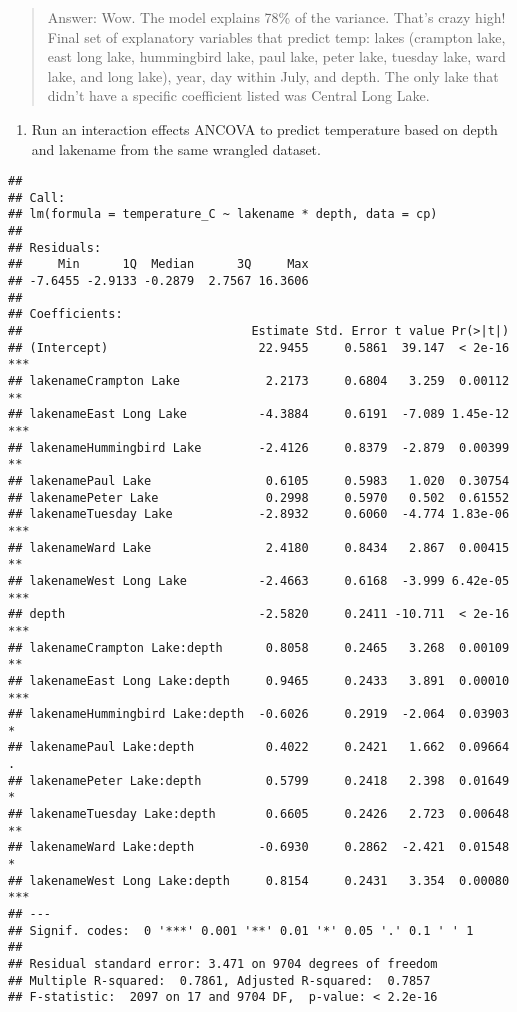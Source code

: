 \documentclass[
]{article}
\providecommand{\tightlist}{%
  \setlength{\itemsep}{0pt}\setlength{\parskip}{0pt}}
\begin{document}
\begin{quote}
Answer: Wow. The model explains 78\% of the variance. That's crazy high!
Final set of explanatory variables that predict temp: lakes (crampton
lake, east long lake, hummingbird lake, paul lake, peter lake, tuesday
lake, ward lake, and long lake), year, day within July, and depth. The
only lake that didn't have a specific coefficient listed was Central
Long Lake.
\end{quote}

\begin{enumerate}
\def\labelenumi{\arabic{enumi}.}
\setcounter{enumi}{5}
\tightlist
\item
  Run an interaction effects ANCOVA to predict temperature based on
  depth and lakename from the same wrangled dataset.
\end{enumerate}

\begin{verbatim}
## 
## Call:
## lm(formula = temperature_C ~ lakename * depth, data = cp)
## 
## Residuals:
##     Min      1Q  Median      3Q     Max 
## -7.6455 -2.9133 -0.2879  2.7567 16.3606 
## 
## Coefficients:
##                                Estimate Std. Error t value Pr(>|t|)    
## (Intercept)                     22.9455     0.5861  39.147  < 2e-16 ***
## lakenameCrampton Lake            2.2173     0.6804   3.259  0.00112 ** 
## lakenameEast Long Lake          -4.3884     0.6191  -7.089 1.45e-12 ***
## lakenameHummingbird Lake        -2.4126     0.8379  -2.879  0.00399 ** 
## lakenamePaul Lake                0.6105     0.5983   1.020  0.30754    
## lakenamePeter Lake               0.2998     0.5970   0.502  0.61552    
## lakenameTuesday Lake            -2.8932     0.6060  -4.774 1.83e-06 ***
## lakenameWard Lake                2.4180     0.8434   2.867  0.00415 ** 
## lakenameWest Long Lake          -2.4663     0.6168  -3.999 6.42e-05 ***
## depth                           -2.5820     0.2411 -10.711  < 2e-16 ***
## lakenameCrampton Lake:depth      0.8058     0.2465   3.268  0.00109 ** 
## lakenameEast Long Lake:depth     0.9465     0.2433   3.891  0.00010 ***
## lakenameHummingbird Lake:depth  -0.6026     0.2919  -2.064  0.03903 *  
## lakenamePaul Lake:depth          0.4022     0.2421   1.662  0.09664 .  
## lakenamePeter Lake:depth         0.5799     0.2418   2.398  0.01649 *  
## lakenameTuesday Lake:depth       0.6605     0.2426   2.723  0.00648 ** 
## lakenameWard Lake:depth         -0.6930     0.2862  -2.421  0.01548 *  
## lakenameWest Long Lake:depth     0.8154     0.2431   3.354  0.00080 ***
## ---
## Signif. codes:  0 '***' 0.001 '**' 0.01 '*' 0.05 '.' 0.1 ' ' 1
## 
## Residual standard error: 3.471 on 9704 degrees of freedom
## Multiple R-squared:  0.7861, Adjusted R-squared:  0.7857 
## F-statistic:  2097 on 17 and 9704 DF,  p-value: < 2.2e-16
\end{verbatim}
\end{document}
